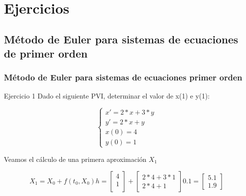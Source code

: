 \documentclass{beamer}
\begin{document}
\section{Ejercicios}

\subsection{Método de Euler para sistemas de ecuaciones de primer orden}

\begin{frame}
	\frametitle{Método de Euler para sistemas de ecuaciones primer orden}
	\begin{block}{Ejercicio 1}
		Dado el siguiente PVI, determinar el valor de x(1) e y(1):
		
		$$
		\begin{cases}
		x' = 2*x + 3 * y\\
		y' = 2*x + y \\
		x(0) = 4\\
		y(0)=1
		\end{cases}
		$$
	\end{block}
	
	Veamos el cálculo de una primera aproximación $X_1$
	
	\begin{equation*}
	X_1=X_0+f(t_0,X_0)h=\begin{bmatrix}
	4\\
	1\\
	\end{bmatrix} + \begin{bmatrix}
	2*4 +3*1\\
	2*4 + 1
	\end{bmatrix}0.1=\begin{bmatrix}
	5.1\\
	1.9
	\end{bmatrix}  
	\end{equation*}
	
\end{frame}
\end{document}
